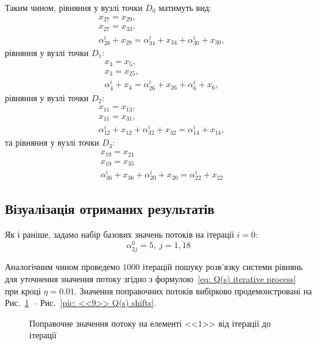 \documentclass{mathreport}
\begin{document}
Таким чином, рівняння у вузлі точки $D_0$ матимуть вид:
\begin{align}
    & x_{27} = x_{29}, \\
    & x_{27} = x_{33}, \\
    & \alpha^{i}_{28} + x_{28} = \alpha^{i}_{34} + x_{34} + \alpha^{i}_{30} + x_{30},
\end{align}
рівняння у вузлі точки $D_1:$
\begin{align}
    & x_{3} = x_{5}, \\
    & x_{3} = x_{25}, \\
    & \alpha^{i}_{4} + x_{4} = \alpha^{i}_{26} + x_{26} + \alpha^{i}_{6} + x_{6},
\end{align}
рівняння у вузлі точки $D_2:$
\begin{align}
    & x_{11} = x_{13}, \\
    & x_{11} = x_{31}, \\
    & \alpha^{i}_{12} + x_{12} + \alpha^{i}_{32} + x_{32} = \alpha^{i}_{14} + x_{14},
\end{align}
та рівняння у вузлі точки $D_3:$
\begin{align}
    & x_{19} = x_{21} \\
    & x_{19} = x_{35} \\
    & \alpha^{i}_{36} + x_{36} + \alpha^{i}_{20} + x_{20} = \alpha^{i}_{22} + x_{22}
\end{align}

\subsection*{Візуалізація отриманих результатів}

Як і раніше, задамо набір базових значень потоків на ітерації $i=0:$
\begin{equation}
    \alpha^{0}_{2j} = 5,\ j=\overline{1,18}
\end{equation}

Аналогічним чином проведемо $1000$ ітерацій пошуку розв'язку системи рівнянь для уточнення значення потоку згідно з формулою~\eqref{eq: Q(s) iterative process} при кроці $\eta=0.01$. Значення поправочних потоків вибірково продемонстровані на Рис.~\ref{pic: <<1>> Q(s) shifts}~-- Рис.~\ref{pic: <<9>> Q(s) shifts}.

\vspace{0.4cm}
\begin{figure}[H]\centering
    \resizebox{\linewidth}{!}{}
    \caption{Поправочне значення потоку на елементі <<$1$>> від ітерації до ітерації}
    \label{pic: <<1>> Q(s) shifts}
\end{figure}
\end{document}
